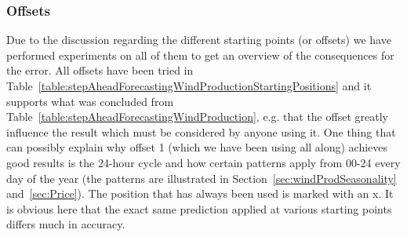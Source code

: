 \subsubsection{Offsets}
Due to the discussion regarding the different starting points (or offsets) we have performed experiments on all of them to get an overview of the consequences for the error. All offsets have been tried in Table~\ref{table:stepAheadForecastingWindProductionStartingPositions} and it supports what was concluded from Table~\ref{table:stepAheadForecastingWindProduction}, e.g. that the offset greatly influence the result which must be considered by anyone using it. One thing that can possibly explain why offset 1 (which we have been using all along) achieves good results is the 24-hour cycle and how certain patterns apply from 00-24 every day of the year (the patterns are illustrated in Section~\ref{sec:windProdSeasonality} and~\ref{sec:Price}). The position that has always been used is marked with an x. It is obvious here that the exact same prediction applied at various starting points differs much in accuracy. 

